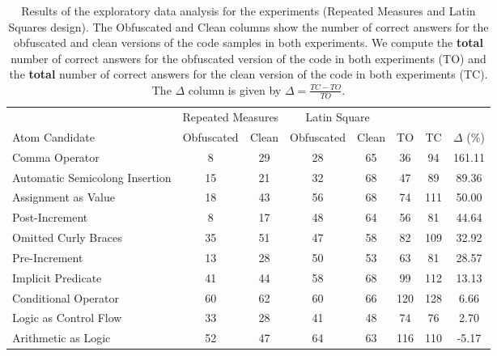 \begin{table}
  \caption{Results of the exploratory data analysis for the experiments (Repeated Measures and Latin Squares design). The Obfuscated and
    Clean columns show the number of correct answers for the obfuscated and clean versions of the code samples in both experiments. We compute the {\bf total} number of correct answers for the obfuscated
    version of the code in both experiments (TO) and the {\bf total} number of correct answers for the clean version of the code in
    both experiments (TC). The $\Delta$ column is given by $\Delta = \frac{TC - TO}{TO}$.}
  \label{tab:merge-exploratory-study}
  \begin{scriptsize}
  \begin{tabular}{lcccc|ccc} \toprule
                                 & \multicolumn{2}{c}{Repeated Measures} & \multicolumn{2}{c}{Latin Square} & \\  
  Atom Candidate                 &   Obfuscated   &   Clean   &   Obfuscated   &   Clean   & TO  & TC  & $\Delta$ (\%)    \\ \midrule
Comma Operator                   &      8         &   29      &       28       &     65    & 36  & 94  & 161.11  \\
Automatic Semicolong Insertion   &     15         &   21      &       32       &     68    & 47  & 89  & 89.36  \\
Assignment as Value              &     18         &   43      &       56       &     68    & 74  & 111 & 50.00  \\
Post-Increment                   &      8         &   17      &       48       &     64    & 56  & 81  & 44.64  \\
Omitted Curly Braces             &     35         &   51      &       47       &     58    & 82  & 109 & 32.92  \\
Pre-Increment                    &     13         &   28      &       50       &     53    & 63  & 81  & 28.57  \\
Implicit Predicate               &     41         &   44      &       58       &     68    & 99  & 112 & 13.13  \\
Conditional Operator             &     60         &   62      &       60       &     66    & 120 & 128 &  6.66  \\
Logic as Control Flow            &     33         &   28      &       41       &     48    & 74  & 76  & 2.70  \\ 
Arithmetic as Logic              &     52         &   47      &       64       &     63    & 116 & 110 & -5.17  \\ \bottomrule
  \end{tabular}
\end{scriptsize}  
\end{table}

